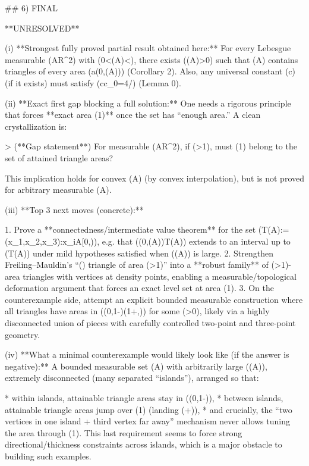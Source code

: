 ## 6) FINAL

**UNRESOLVED**

(i) **Strongest fully proved partial result obtained here:**
For every Lebesgue measurable (A\subset\mathbb R^2) with (0<\mu(A)<\infty), there exists (\varepsilon(A)>0) such that (A) contains triangles of every area (a\in(0,\varepsilon(A))) (Corollary 2). Also, any universal constant (c) (if it exists) must satisfy (c\ge c_0=4\pi/) (Lemma 0).

(ii) **Exact first gap blocking a full solution:**
One needs a rigorous principle that forces **exact area (1)** once the set has “enough area.” A clean crystallization is:

> (**Gap statement**) For measurable (A\subset\mathbb R^2), if (>1), must (1) belong to the set of attained triangle areas?

This implication holds for convex (A) (by convex interpolation), but is not proved for arbitrary measurable (A).

(iii) **Top 3 next moves (concrete):**

1. Prove a **connectedness/intermediate value theorem** for the set
   (\mathcal T(A):={(x_1,x_2,x_3):x_i\in A}\subset[0,\infty)), e.g. that ((0,\varepsilon(A))\subset\mathcal T(A)) extends to an interval up to (\sup\mathcal T(A)) under mild hypotheses satisfied when (\mu(A)) is large.
2. Strengthen Freiling–Mauldin’s “(\exists) triangle of area (>1)” into a **robust family** of (>1)-area triangles with vertices at density points, enabling a measurable/topological deformation argument that forces an exact level set at area (1).
3. On the counterexample side, attempt an explicit bounded measurable construction where all triangles have areas in ((0,1-\delta)\cup(1+\delta,\infty)) for some (\delta>0), likely via a highly disconnected union of pieces with carefully controlled two-point and three-point geometry.

(iv) **What a minimal counterexample would likely look like (if the answer is negative):**
A bounded measurable set (A) with arbitrarily large (\mu(A)), extremely disconnected (many separated “islands”), arranged so that:

* within islands, attainable triangle areas stay in ((0,1-\delta)),
* between islands, attainable triangle areas jump over (1) (landing (+\delta)),
* and crucially, the “two vertices in one island + third vertex far away” mechanism never allows tuning the area through (1).
  This last requirement seems to force strong directional/thickness constraints across islands, which is a major obstacle to building such examples.

